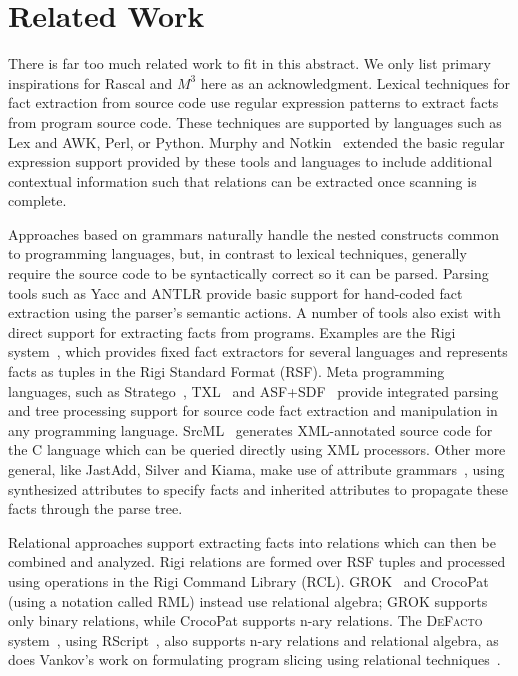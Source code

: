 \documentclass[conference]{IEEEtran}
\newcommand{\Rascal}{\textsc{Rascal}}
\newcommand{\DeFacto}{\textsc{DeFacto}\xspace}
\newcommand{\mthree}{\ensuremath{M^3}\xspace}
\begin{document}
\section{Related Work}

There is far too much related work to fit in this abstract. We only list primary inspirations for Rascal and \mthree here as an acknowledgment.
%
Lexical techniques for fact extraction from source code use regular expression patterns to extract facts from
program source code. These techniques are supported by languages such as Lex and AWK, Perl, or Python. Murphy and
Notkin~\cite{MurphyNotkin95,DBLP:journals/tosem/MurphyN96} extended the
basic regular expression support provided by these tools and languages
to include additional contextual information such that relations can be extracted once scanning is complete.

Approaches based on grammars naturally handle the nested constructs common to
programming languages, but, in contrast to lexical techniques, generally
require the source code to be syntactically correct so it can be parsed.
Parsing tools such as Yacc and ANTLR provide basic support for hand-coded
fact extraction using the parser's semantic actions. A number of tools also
exist with direct support for extracting facts from programs. Examples are
the Rigi system~\cite{Mueller88}, which provides fixed fact extractors for
several languages and represents facts as tuples in the Rigi Standard Format
(RSF). Meta programming languages, such as Stratego~\cite{BKVV06}, TXL~\cite{TXL06} and ASF+SDF~\cite{BDHJJKKMOSVVV01} provide integrated parsing and tree processing support for source code fact extraction and manipulation in any programming language. SrcML~\cite{srcml} generates XML-annotated source code for the C language which can be queried directly using XML processors. Other more general, like JastAdd, Silver and Kiama, make use of attribute
grammars~\cite{FNC2,Paakki95,EkmanHedin07,kiama,DBLP:journals/scp/WykBGK10},
using synthesized attributes to specify facts and inherited attributes to
propagate these facts through the parse tree.

Relational approaches support extracting facts into relations which can then
be combined and analyzed. Rigi relations are formed over RSF tuples and
processed using operations in the Rigi Command Library (RCL).
GROK~\cite{Holt96} and CrocoPat~\cite{BeyerEtAl03,beyer05efficient} (using a
notation called RML) instead use relational algebra; GROK supports only binary
relations, while CrocoPat supports n-ary relations. The \DeFacto
system~\cite{DBLP:conf/sle/BastenK08}, using RScript~\cite{KlintRscript}, also
supports n-ary relations and relational algebra, as does Vankov's work on
formulating program slicing using relational techniques~\cite{Vankov05}.
\end{document}
